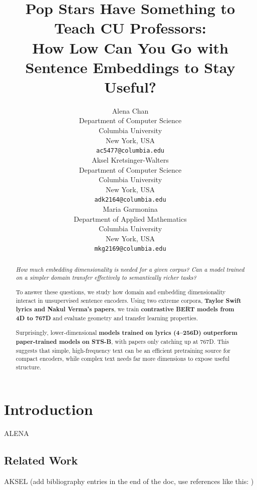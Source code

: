 \documentclass{article}
\title{Pop Stars Have Something to Teach CU Professors: \\
\large{How Low Can You Go with Sentence Embeddings to Stay Useful?}}
\begin{document}
\author{%
  Alena Chan \\
  Department of Computer Science \\
  Columbia University \\
  New York, USA \\
  \texttt{ac5477@columbia.edu} \\
  \And
  Aksel Kretsinger-Walters \\
  Department of Computer Science \\
  Columbia University \\
  New York, USA \\
  \texttt{adk2164@columbia.edu} \\
  \And
  Maria Garmonina \\
  Department of Applied Mathematics \\
  Columbia University \\
  New York, USA \\
  \texttt{mkg2169@columbia.edu} \\
}

\maketitle

\begin{abstract}
		\textit{How much embedding dimensionality is needed for a given corpus? Can a model
		trained on a simpler domain transfer effectively to semantically richer tasks?}

		To answer these questions, we study how domain and embedding dimensionality interact in
		unsupervised sentence encoders. Using two extreme corpora, \textbf{Taylor Swift lyrics
		and Nakul Verma's papers}, we train \textbf{contrastive BERT models from 4D to 767D}
		and evaluate geometry and transfer learning properties.

		Surprisingly, lower-dimensional \textbf{models trained on lyrics (4–256D) outperform
		paper-trained models on STS-B}, with papers only catching up at 767D. This suggests
		that simple, high-frequency text can be an efficient pretraining source for compact
		encoders, while complex text needs far more dimensions to expose useful structure.
\end{abstract}

\section{Introduction}
ALENA

\subsection{Related Work}
AKSEL (add bibliography entries in the end of the doc, use references like this: \cite{wang2020})
\end{document}
